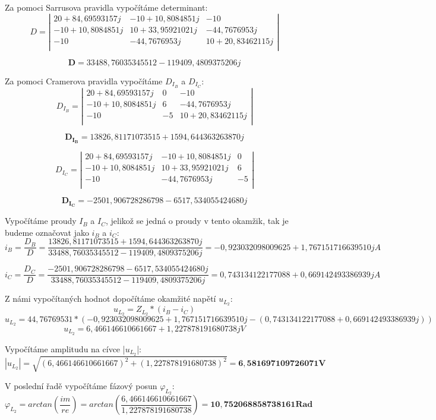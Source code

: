 Za pomoci Sarrusova pravidla vypočítáme determinant:
\[
D = 
\left|
\begin{array}{ccc}
20+84,69593157j & -10+10,8084851j & -10\\
-10+10,8084851j & 10+33,95921021j & -44,7676953j\\
-10 & -44,7676953j & 10+20,83462115j\\
\end{array}
\right|
\]
\newline

$$\mathbf{D} = 33488,76035345512 - 119409,4809375206j$$
\newline

Za pomoci Cramerova pravidla vypočítáme $D_{I_B}$ a $D_{I_C}$:
\[
D_{I_B} = 
\left|
\begin{array}{ccc}
20+84,69593157j & 0 & -10\\
-10+10,8084851j & 6 & -44,7676953j\\
-10 & -5 & 10+20,83462115j\\
\end{array}
\right|
\]
\newline

$$\mathbf{D_{I_B}} = 13826,81171073515 + 1594,644363263870j$$

\newpage
\[
D_{I_C} = 
\left|
\begin{array}{ccc}
20+84,69593157j & -10+10,8084851j & 0\\
-10+10,8084851j & 10+33,95921021j & 6\\
-10 & -44,7676953j & -5\\
\end{array}
\right|
\]
\newline

$$\mathbf{D_{I_C}} = -2501,906728286798 - 6517,534055424680j$$
\newline

Vypočítáme proudy $I_B$ a $I_C$, jelikož se jedná o proudy v tento okamžik, tak je budeme označovat jako $i_B$ a $i_C$:
$$i_B = \frac{D_B}{D} = \frac{13826,81171073515 + 1594,644363263870j}{33488,76035345512 - 119409,4809375206j} = -0,923032098009625 + 1,767151716639510j A $$
\newline

$$i_C = \frac{D_C}{D} = \frac{-2501,906728286798 - 6517,534055424680j}{33488,76035345512 - 119409,4809375206j} = 0,743134122177088 + 0,669142493386939j A $$
\newline

Z námi vypočítaných hodnot dopočítáme okamžité napětí $u_{L_2}$:
$$u_{L_2} = Z_{L_2} * (i_B - i_C)$$
$$u_{L_2}= 44,76769531 * (-0,923032098009625 + 1,767151716639510j - (0,743134122177088 + 0,669142493386939j))$$
$$u_{L_2} = 6,466146610661667 + 1,227878191680738jV$$
\newline

Vypočítáme amplitudu na cívce |$u_{L_2}$|:
$$|u_{L_2}| = \sqrt{(6,466146610661667)^2 + (1,227878191680738)^2} = \mathbf{6,581697109726071V}$$
\newline

V poslední řadě vypočítáme fázový posun $\varphi_{L_2}$:
$$\varphi_{L_2} = arctan(\frac{im}{re}) = arctan(\frac{6,466146610661667}{1,227878191680738}) = \mathbf{10,752068858738161Rad}$$
